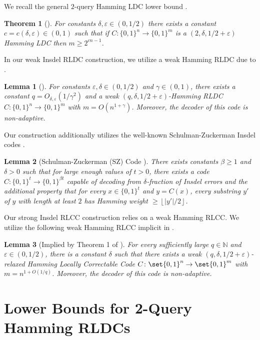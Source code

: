 \documentclass[10pt,a4paper]{article}
\newtheorem{lemma}{Lemma}
\newtheorem{theorem}{Theorem}
\theoremstyle{remark}
\newcommand{\zo}{\ensuremath{{\{0,1\}}}\xspace}
\newcommand{\eps}{\ensuremath{\varepsilon}}
\newcommand{\floor}[1]{\ensuremath{\left\lfloor{#1}\right\rfloor}\xspace}
\newcommand{\NAT}{\ensuremath{\mathbb{N}}}
\begin{document}
We recall the general $2$-query Hamming LDC lower bound  \cite{KerenidisW04, Ben-AroyaRW08}.
\begin{theorem}[\cite{KerenidisW04, Ben-AroyaRW08}]\label{thm:two-query-lb}
    For constants $\delta, \eps \in (0,1/2)$ there exists a constant $c = c(\delta, \eps) \in (0,1)$ such that if $C \colon \zo^n \rightarrow \zo^m$ is a $(2, \delta, 1/2+\eps)$ Hamming LDC then $m \geq 2^{cn-1}$.
\end{theorem}

In our weak Insdel RLDC construction, we utilize a weak Hamming RLDC due to \cite{Ben-SassonGHSV06}.
\begin{lemma}[\cite{Ben-SassonGHSV06}]\label{lem:weak-ham-rldc}
    For constants $\eps, \delta \in (0,1/2)$ and $\gamma \in (0,1)$, there exists a constant $q = O_{\delta,\eps}(1/\gamma^2)$ and a weak $(q,\delta, 1/2+\eps)$-Hamming RLDC $C \colon \zo^n \rightarrow \zo^m$ with $m = O(n^{1+\gamma})$.
    Moreover, the decoder of this code is non-adaptive.
\end{lemma}

Our construction additionally utilizes the well-known Schulman-Zuckerman Insdel codes \cite{SchZuc99}.
\begin{lemma}[Schulman-Zuckerman (SZ) Code \cite{SchZuc99}]\label{lem:sz-code}
    There exists constants $\beta \geq 1$ and $\delta > 0$ such that for large enough values of $t > 0$, there exists a code $C \colon \zo^t \rightarrow \zo^{\beta t}$ capable of decoding from $\delta$-fraction of Insdel errors and the additional property that for every $x \in \zo^t$ and $y = C(x)$, every substring $y'$ of $y$ with length at least $2$ has Hamming weight $\geq \floor{|y'|/2}$.
\end{lemma}

Our strong Insdel RLCC construction relies on a weak Hamming RLCC.
We utilize the following weak Hamming RLCC implicit in \cite{AsadiS21}.
\begin{lemma}[Implied by Theorem 1 of \cite{AsadiS21}]
\label{lem:rlcc}
    For every sufficiently large $q\in \NAT$ and $\eps\in (0,1/2)$, there is a constant $\delta$ such that there exists a weak $(q, \delta, 1/2 + \eps)$-relaxed Hamming Locally Correctable Code $C\colon \set{0,1}^n\rightarrow \set{0,1}^m$ with $m = n^{1+O(1/q)}$. 
    Moreover, the decoder of this code is non-adaptive.
\end{lemma}

\section{Lower Bounds for 2-Query Hamming RLDCs} \label{sec:2qrldc}
\end{document}
